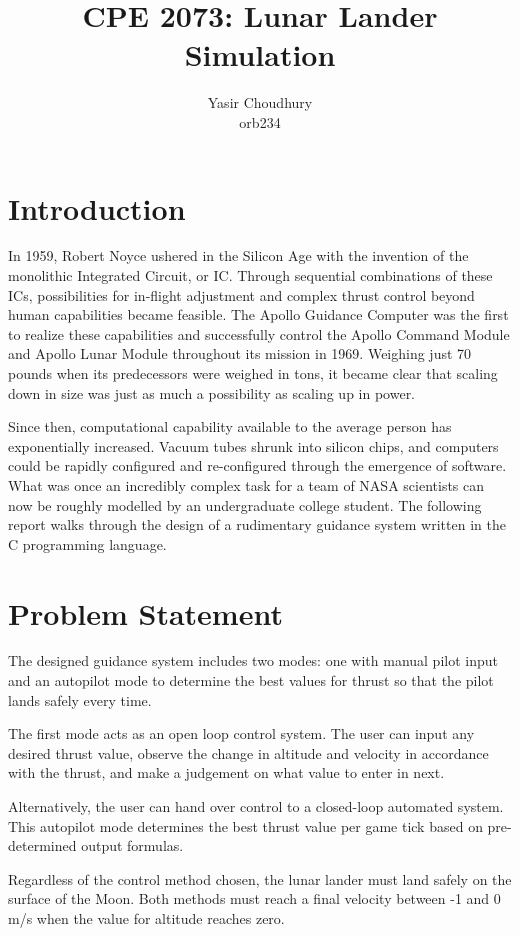 \documentclass{article}
\title{CPE 2073: Lunar Lander Simulation}
\author{Yasir Choudhury \\ orb234}
\begin{document}
\maketitle

\section{Introduction}

In 1959, Robert Noyce ushered in the Silicon Age with the invention of the monolithic Integrated Circuit, or IC. Through sequential combinations of these ICs, possibilities for in-flight adjustment and complex thrust control beyond human capabilities became feasible. The Apollo Guidance Computer was the first to realize these capabilities and successfully control the Apollo Command Module and Apollo Lunar Module throughout its mission in 1969. Weighing just 70 pounds when its predecessors were weighed in tons, it became clear that scaling down in size was just as much a possibility as scaling up in power.

Since then, computational capability available to the average person has exponentially increased. Vacuum tubes shrunk into silicon chips, and computers could be rapidly configured and re-configured through the emergence of software. What was once an incredibly complex task for a team of NASA scientists can now be roughly modelled by an undergraduate college student. The following report walks through the design of a rudimentary guidance system written in the C programming language.

\section{Problem Statement}

The designed guidance system includes two modes: one with manual pilot input and an autopilot mode to determine the best values for thrust so that the pilot lands safely every time.

The first mode acts as an open loop control system. The user can input any desired thrust value, observe the change in altitude and velocity in accordance with the thrust, and make a judgement on what value to enter in next.

Alternatively, the user can hand over control to a closed-loop automated system. This autopilot mode determines the best thrust value per game tick based on pre-determined output formulas.

Regardless of the control method chosen, the lunar lander must land safely on the surface of the Moon. Both methods must reach a final velocity between -1 and 0 m/s when the value for altitude reaches zero.
\end{document}
